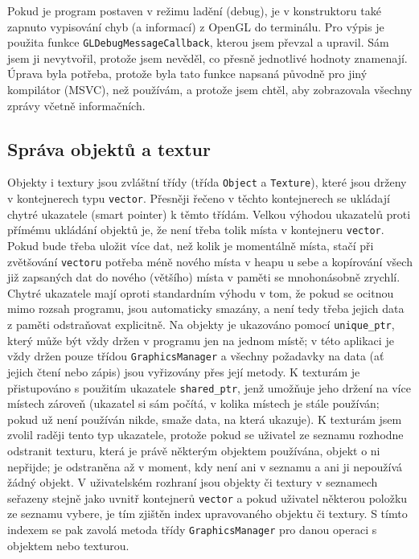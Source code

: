 \documentclass[a4paper, 11pt]{report}
\begin{document}
Pokud je program postaven v režimu ladění (debug), je v konstruktoru také zapnuto vypisování chyb (a informací) z OpenGL do terminálu. Pro výpis je použita funkce \texttt{GLDebugMessageCallback}, kterou jsem převzal a upravil. Sám jsem ji nevytvořil, protože jsem nevěděl, co přesně jednotlivé hodnoty znamenají. Úprava byla potřeba, protože byla tato funkce napsaná původně pro jiný kompilátor (MSVC), než používám, a protože jsem chtěl, aby zobrazovala všechny zprávy včetně informačních.

\subsection{Správa objektů a textur}
Objekty i textury jsou zvláštní třídy (třída \texttt{Object} a \texttt{Texture}), které jsou drženy v kontejnerech typu \texttt{vector}. Přesněji řečeno v těchto kontejnerech se ukládají chytré ukazatele (smart pointer) k těmto třídám. Velkou výhodou ukazatelů proti přímému ukládání objektů je, že není třeba tolik místa v kontejneru \texttt{vector}. Pokud bude třeba uložit více dat, než kolik je momentálně místa, stačí při zvětšování \texttt{vectoru} potřeba méně nového místa v heapu u sebe a kopírování všech již zapsaných dat do nového (většího) místa v paměti se mnohonásobně zrychlí. Chytré ukazatele mají oproti standardním výhodu v tom, že pokud se ocitnou mimo rozsah programu, jsou automaticky smazány, a není tedy třeba jejich data z paměti odstraňovat explicitně. Na objekty je ukazováno pomocí \texttt{unique\_ptr}, který může být vždy držen v programu jen na jednom místě; v této aplikaci je vždy držen pouze třídou \texttt{GraphicsManager} a všechny požadavky na data (ať jejich čtení nebo zápis) jsou vyřizovány přes její metody. K texturám je přistupováno s použitím ukazatele \texttt{shared\_ptr}, jenž umožňuje jeho držení na více místech zároveň (ukazatel si sám počítá, v kolika místech je stále používán; pokud už není používán nikde, smaže data, na která ukazuje). K texturám jsem zvolil raději tento typ ukazatele, protože pokud se uživatel ze seznamu rozhodne odstranit texturu, která je právě některým objektem používána, objekt o ni nepřijde; je odstraněna až v moment, kdy není ani v seznamu a ani ji nepoužívá žádný objekt. V uživatelském rozhraní jsou objekty či textury v seznamech seřazeny stejně jako uvnitř kontejnerů \texttt{vector} a pokud uživatel některou položku ze seznamu vybere, je tím zjištěn index upravovaného objektu či textury. S tímto indexem se pak zavolá metoda třídy \texttt{GraphicsManager} pro danou operaci s objektem nebo texturou.
\end{document}
